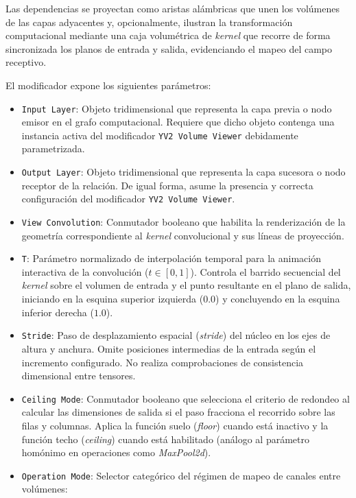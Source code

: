 Las dependencias se proyectan como aristas alámbricas que unen los volúmenes de las capas adyacentes y, opcionalmente, ilustran la transformación computacional mediante
una caja volumétrica de \textit{kernel} que recorre de forma sincronizada los planos de entrada y salida, evidenciando el mapeo del campo receptivo.
\medskip

El modificador expone los siguientes parámetros:

\begin{itemize}
    \item \texttt{Input Layer}: Objeto tridimensional que representa la capa previa o nodo emisor en el grafo computacional. Requiere que dicho objeto contenga una 
    instancia activa del modificador \texttt{YV2 Volume Viewer} debidamente parametrizada.
    \item \texttt{Output Layer}: Objeto tridimensional que representa la capa sucesora o nodo receptor de la relación. De igual forma, asume la presencia y correcta 
    configuración del modificador \texttt{YV2 Volume Viewer}.
    \item \texttt{View Convolution}: Conmutador booleano que habilita la renderización de la geometría correspondiente al \textit{kernel} convolucional y sus líneas de proyección.
    \item \texttt{T}: Parámetro normalizado de interpolación temporal para la animación interactiva de la convolución ($t \in [0, 1]$). Controla el barrido secuencial del 
    \textit{kernel} sobre el volumen de entrada y el punto resultante en el plano de salida, iniciando en la esquina superior izquierda ($0.0$) y concluyendo en la esquina inferior derecha ($1.0$).
    \item \texttt{Stride}: Paso de desplazamiento espacial (\textit{stride}) del núcleo en los ejes de altura y anchura. Omite posiciones intermedias de la entrada 
    según el incremento configurado. No realiza comprobaciones de consistencia dimensional entre tensores.
    \item \texttt{Ceiling Mode}: Conmutador booleano que selecciona el criterio de redondeo al calcular las dimensiones de salida si el paso fracciona el recorrido 
    sobre las filas y columnas. Aplica la función suelo (\textit{floor}) cuando está inactivo y la función techo (\textit{ceiling}) cuando está habilitado 
    (análogo al parámetro homónimo en operaciones como \textit{MaxPool2d}).
    \item \texttt{Operation Mode}: Selector categórico del régimen de mapeo de canales entre volúmenes:

\end{itemize}
